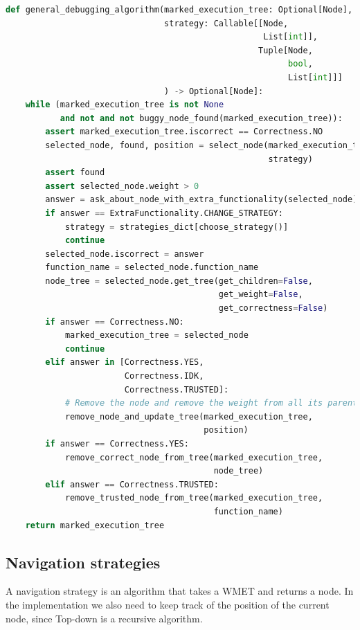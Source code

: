 \begin{lstlisting}[language=Python, caption=General debugging algorithm implementation]
def general_debugging_algorithm(marked_execution_tree: Optional[Node],
                                strategy: Callable[[Node,
                                                    List[int]],
                                                   Tuple[Node,
                                                         bool,
                                                         List[int]]]
                                ) -> Optional[Node]:
    while (marked_execution_tree is not None
           and not and not buggy_node_found(marked_execution_tree)):
        assert marked_execution_tree.iscorrect == Correctness.NO
        selected_node, found, position = select_node(marked_execution_tree,
                                                     strategy)
        assert found
        assert selected_node.weight > 0
        answer = ask_about_node_with_extra_functionality(selected_node)
        if answer == ExtraFunctionality.CHANGE_STRATEGY:
            strategy = strategies_dict[choose_strategy()]
            continue
        selected_node.iscorrect = answer
        function_name = selected_node.function_name
        node_tree = selected_node.get_tree(get_children=False,
                                           get_weight=False,
                                           get_correctness=False)
        if answer == Correctness.NO:
            marked_execution_tree = selected_node
            continue
        elif answer in [Correctness.YES,
                        Correctness.IDK,
                        Correctness.TRUSTED]:
            # Remove the node and remove the weight from all its parents
            remove_node_and_update_tree(marked_execution_tree,
                                        position)
        if answer == Correctness.YES:
            remove_correct_node_from_tree(marked_execution_tree,
                                          node_tree)
        elif answer == Correctness.TRUSTED:
            remove_trusted_node_from_tree(marked_execution_tree,
                                          function_name)
    return marked_execution_tree
\end{lstlisting}
\subsection{Navigation strategies}
\label{implementation:Strategies}
A navigation strategy is an algorithm that takes a WMET and returns a node.
In the implementation we also need to keep track of the position of the current node, since Top-down is a recursive algorithm.

